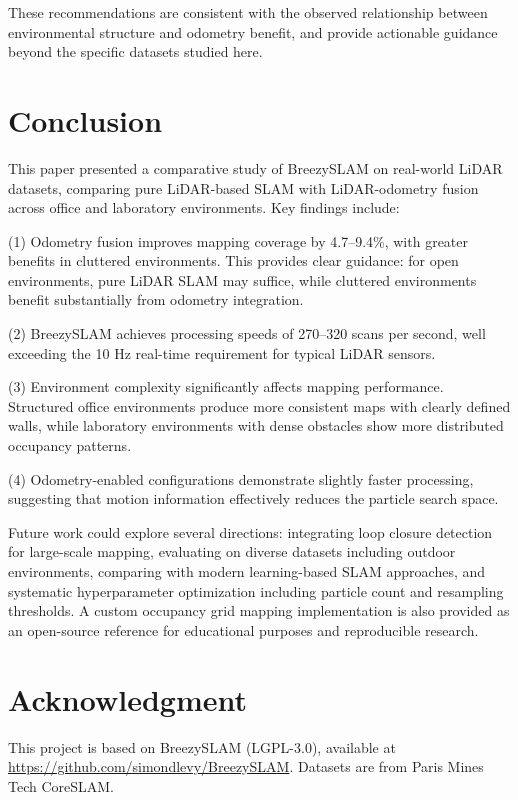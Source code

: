 \documentclass[conference]{IEEEtran}
\begin{document}
  These recommendations are consistent with the observed relationship between environmental structure and
  odometry benefit, and provide actionable guidance beyond the specific datasets studied here. 
  
  \section{Conclusion}

  This paper presented a comparative study of BreezySLAM on real-world LiDAR datasets, comparing pure
  LiDAR-based SLAM with LiDAR-odometry fusion across office and laboratory environments. Key findings
  include:

  (1) Odometry fusion improves mapping coverage by 4.7--9.4\%, with greater benefits in cluttered
  environments. This provides clear guidance: for open environments, pure LiDAR SLAM may suffice, while
  cluttered environments benefit substantially from odometry integration.

  (2) BreezySLAM achieves processing speeds of 270--320 scans per second, well exceeding the 10 Hz
  real-time requirement for typical LiDAR sensors.

  (3) Environment complexity significantly affects mapping performance. Structured office environments
  produce more consistent maps with clearly defined walls, while laboratory environments with dense
  obstacles show more distributed occupancy patterns.

  (4) Odometry-enabled configurations demonstrate slightly faster processing, suggesting that motion
  information effectively reduces the particle search space.

  Future work could explore several directions: integrating loop closure detection for large-scale
  mapping, evaluating on diverse datasets including outdoor environments, comparing with modern
  learning-based SLAM approaches, and systematic hyperparameter optimization including particle count and
  resampling thresholds. A custom occupancy grid mapping implementation is also provided as an open-source
  reference for educational purposes and reproducible research.

  \section*{Acknowledgment}

  This project is based on BreezySLAM (LGPL-3.0), available at
  \url{https://github.com/simondlevy/BreezySLAM}. Datasets are from Paris Mines Tech CoreSLAM.
\end{document}
